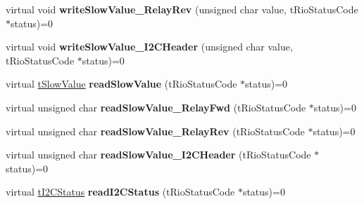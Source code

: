\begin{DoxyCompactItemize}
\item 
\hypertarget{classnFPGA_1_1nFRC__2012__1__6__4_1_1tDIO_a6152d932035873e711c1d144e0887052}{
virtual void {\bfseries writeSlowValue\_\-RelayRev} (unsigned char value, tRioStatusCode $\ast$status)=0}
\label{classnFPGA_1_1nFRC__2012__1__6__4_1_1tDIO_a6152d932035873e711c1d144e0887052}

\item 
\hypertarget{classnFPGA_1_1nFRC__2012__1__6__4_1_1tDIO_a03f6bce5b14aa37d1e0ac07e7c464af1}{
virtual void {\bfseries writeSlowValue\_\-I2CHeader} (unsigned char value, tRioStatusCode $\ast$status)=0}
\label{classnFPGA_1_1nFRC__2012__1__6__4_1_1tDIO_a03f6bce5b14aa37d1e0ac07e7c464af1}

\item 
\hypertarget{classnFPGA_1_1nFRC__2012__1__6__4_1_1tDIO_a35a6cf28b01d1267d18bae0feb7fb30a}{
virtual \hyperlink{unionnFPGA_1_1nFRC__2012__1__6__4_1_1tDIO_1_1tSlowValue}{tSlowValue} {\bfseries readSlowValue} (tRioStatusCode $\ast$status)=0}
\label{classnFPGA_1_1nFRC__2012__1__6__4_1_1tDIO_a35a6cf28b01d1267d18bae0feb7fb30a}

\item 
\hypertarget{classnFPGA_1_1nFRC__2012__1__6__4_1_1tDIO_a2b0a19993e257ccf6b100d105e4452ac}{
virtual unsigned char {\bfseries readSlowValue\_\-RelayFwd} (tRioStatusCode $\ast$status)=0}
\label{classnFPGA_1_1nFRC__2012__1__6__4_1_1tDIO_a2b0a19993e257ccf6b100d105e4452ac}

\item 
\hypertarget{classnFPGA_1_1nFRC__2012__1__6__4_1_1tDIO_ad0f29d9c9491b2c20e8b4d9cf804108e}{
virtual unsigned char {\bfseries readSlowValue\_\-RelayRev} (tRioStatusCode $\ast$status)=0}
\label{classnFPGA_1_1nFRC__2012__1__6__4_1_1tDIO_ad0f29d9c9491b2c20e8b4d9cf804108e}

\item 
\hypertarget{classnFPGA_1_1nFRC__2012__1__6__4_1_1tDIO_af256c3a6cb71de04ac4e6bf84db710d5}{
virtual unsigned char {\bfseries readSlowValue\_\-I2CHeader} (tRioStatusCode $\ast$status)=0}
\label{classnFPGA_1_1nFRC__2012__1__6__4_1_1tDIO_af256c3a6cb71de04ac4e6bf84db710d5}

\item 
\hypertarget{classnFPGA_1_1nFRC__2012__1__6__4_1_1tDIO_a5eef511556ce5d7229bdae12d8371026}{
virtual \hyperlink{unionnFPGA_1_1nFRC__2012__1__6__4_1_1tDIO_1_1tI2CStatus}{tI2CStatus} {\bfseries readI2CStatus} (tRioStatusCode $\ast$status)=0}
\label{classnFPGA_1_1nFRC__2012__1__6__4_1_1tDIO_a5eef511556ce5d7229bdae12d8371026}


\end{DoxyCompactItemize}
